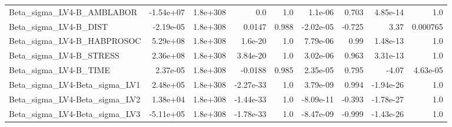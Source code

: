 \begin{tabular}{lrrrrrrrr}
Beta\_sigma\_LV4-B\_AMBLABOR     &   -1.54e+07 &     1.8e+308 &       0.0 &      1.0 &    1.1e-06 &       0.703 &     4.85e-14 &           1.0 \\
Beta\_sigma\_LV4-B\_DIST         &   -2.19e-05 &     1.8e+308 &    0.0147 &    0.988 &  -2.02e-05 &      -0.725 &         3.37 &      0.000765 \\
Beta\_sigma\_LV4-B\_HABPROSOC    &    5.29e+08 &     1.8e+308 &   1.6e-20 &      1.0 &   7.79e-06 &        0.99 &     1.48e-13 &           1.0 \\
Beta\_sigma\_LV4-B\_STRESS       &    2.36e+08 &     1.8e+308 &  3.84e-20 &      1.0 &   3.02e-06 &       0.963 &     3.31e-13 &           1.0 \\
Beta\_sigma\_LV4-B\_TIME         &    2.37e-05 &     1.8e+308 &   -0.0188 &    0.985 &   2.35e-05 &       0.795 &        -4.07 &      4.63e-05 \\
Beta\_sigma\_LV4-Beta\_sigma\_LV1 &    2.48e+05 &     1.8e+308 & -2.27e-33 &      1.0 &   3.79e-09 &       0.994 &    -1.94e-26 &           1.0 \\
Beta\_sigma\_LV4-Beta\_sigma\_LV2 &    1.38e+04 &     1.8e+308 & -1.44e-33 &      1.0 &  -8.09e-11 &      -0.393 &    -1.78e-27 &           1.0 \\
Beta\_sigma\_LV4-Beta\_sigma\_LV3 &   -5.11e+05 &     1.8e+308 & -1.78e-33 &      1.0 &  -8.47e-09 &      -0.999 &    -1.43e-26 &           1.0 \\
\bottomrule
\end{tabular}
